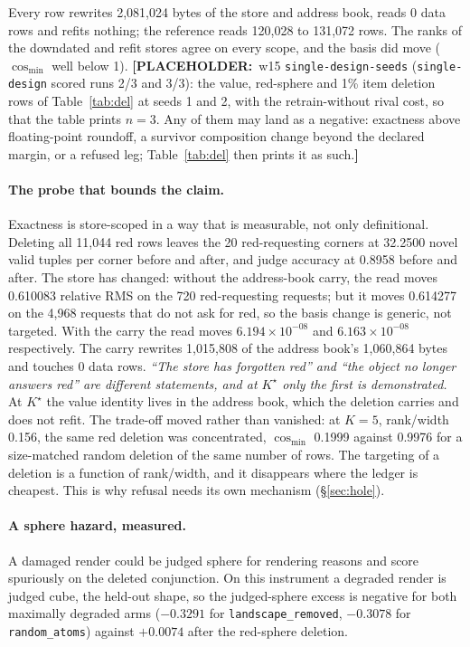 \documentclass{article} %
\newcommand{\PLACEHOLDER}[1]{{\color{red}\textbf{[PLACEHOLDER:}~#1\textbf{]}}}
\newcommand{\sci}[2]{\ensuremath{#1\times10^{#2}}}
\newcommand{\Kstar}{\ensuremath{K^{\star}}}
\begin{document}
\noindent Every row rewrites 2,081,024 bytes of the store and address book, reads 0 data rows
and refits nothing; the reference reads 120,028 to 131,072 rows. %
The ranks of the downdated and refit stores agree on every scope, and the basis did move
($\cos_{\min}$ well below 1). %
\PLACEHOLDER{w15 \texttt{single-design-seeds} (\texttt{single-design} scored runs 2/3 and 3/3):
the value, red-sphere and 1\% item deletion rows of Table~\ref{tab:del} at seeds 1 and 2, with
the retrain-without rival cost, so that the table prints $n=3$. Any of them may land as a
negative: exactness above floating-point roundoff, a survivor composition change beyond the
declared margin, or a refused leg; Table~\ref{tab:del} then prints it as such.}

\paragraph{The probe that bounds the claim.} Exactness is store-scoped in a way that is
measurable, not only definitional. Deleting all 11,044 red rows leaves the 20 red-requesting
corners at 32.2500 novel valid tuples per corner before and after, and judge accuracy at
0.8958 before and after. %
The store has changed: without the address-book carry, the read moves 0.610083 relative RMS on
the 720 red-requesting requests; but it moves 0.614277 on the 4,968 requests that do not ask
for red, so the basis change is generic, not targeted. With the carry the read moves
\sci{6.194}{-08} and \sci{6.163}{-08} respectively. The carry rewrites 1,015,808 of the
address book's 1,060,864 bytes and touches 0 data rows. %
\emph{``The store has forgotten red'' and ``the object no longer answers red'' are different
statements, and at $\Kstar$ only the first is demonstrated.} At $\Kstar$ the value identity
lives in the address book, which the deletion carries and does not refit. The trade-off moved
rather than vanished: at $K=5$, rank/width 0.156, the same red deletion was concentrated,
$\cos_{\min}$ 0.1999 against 0.9976 for a size-matched random deletion of the same number of
rows. %
The targeting of a deletion is a function of rank/width, and it disappears where the ledger is
cheapest. This is why refusal needs its own mechanism (\S\ref{sec:hole}).

\paragraph{A sphere hazard, measured.} A damaged render could be judged sphere for rendering
reasons and score spuriously on the deleted conjunction. On this instrument a degraded render
is judged cube, the held-out shape, so the judged-sphere excess is negative for both maximally
degraded arms ($-0.3291$ for \texttt{landscape\_removed}, $-0.3078$ for
\texttt{random\_atoms}) against $+0.0074$ after the red-sphere deletion.
\end{document}
